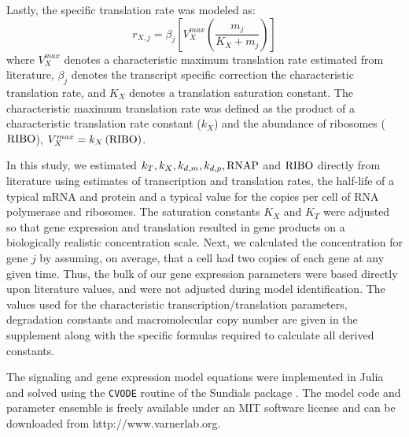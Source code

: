 \documentclass[11pt,letterpaper]{article}
\begin{document}
Lastly, the specific translation rate was modeled as:
\begin{equation}
  r_{X,j} = \beta_{j}\left[V^{max}_{X}\left(\frac{m_{j}}{K_{X}+m_{j}}\right)\right]
\end{equation}where $V^{max}_{X}$ denotes a characteristic maximum translation rate estimated from literature, $\beta_{j}$ denotes the transcript specific correction the characteristic translation rate,
and $K_{X}$ denotes a translation saturation constant.
The characteristic maximum translation rate was defined as the product of a characteristic translation rate constant ($k_{X}$)
and the abundance of ribosomes ($\rm RIBO$), $V^{max}_{X} = k_{X}\left(\rm RIBO\right)$.

In this study, we estimated $k_{T}, k_{X}, k_{d,m}, k_{d,p}, \rm RNAP$ and $\rm RIBO$ directly from literature using estimates of transcription and translation rates,
the half-life of a typical mRNA and protein and a typical value for the copies per cell of RNA polymerase and ribosomes.
The saturation constants $K_{X}$ and $K_{T}$ were adjusted so that gene expression and translation resulted in gene products on a biologically realistic concentration scale.
Next, we calculated the concentration for gene $j$ by assuming, on average,
that a cell had two copies of each gene at any given time. Thus, the bulk of our gene expression parameters were based directly upon literature values, and were not adjusted during model identification. The values used for the characteristic transcription/translation parameters, degradation constants and macromolecular copy number are given in the supplement along with the specific formulas required to calculate all derived constants.

The signaling and gene expression model equations were implemented in Julia and solved using the \texttt{CVODE} routine of the Sundials package \cite{Julia,Hindmarsh2005}.
The model code and parameter ensemble is freely available under an MIT software license and can be downloaded from http://www.varnerlab.org.
\end{document}
